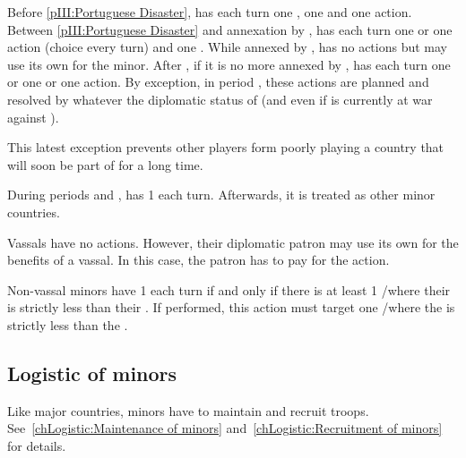 \aparag[Portugal]
\bparag Before \ref{pIII:Portuguese Disaster}, \paysPortugal has each turn one
\COL, one \TP and one \TFI action.
\bparag Between \ref{pIII:Portuguese Disaster} and annexation by \HIS,
\paysPortugal has each turn one \COL or one \TP action (choice every turn) and
one \TFI.
\bparag While annexed by \HIS, \paysPortugal has no actions but \HIS may use
its own for the minor.
\bparag After , if it is no more annexed by \HIS,
\paysPortugal has each turn one \COL or one \TP or one \TFI action.
\bparag By exception, in period , these actions are planned and
resolved by \HIS whatever the diplomatic status of \paysPortugal (and even if
\HIS is currently at war against \paysPortugal).

\begin{designnote}
  This latest exception prevents other players form poorly playing a country
  that will soon be part of \HIS for a long time.
\end{designnote}


\aparag[Venice]
\bparag During periods  and , \paysVenise has 1 \TFI each
turn.
\bparag Afterwards, it is treated as other minor countries.

\aparag[Vassals]
\bparag Vassals have no actions. However, their diplomatic patron may use its
own \TFI for the benefits of a vassal.
\bparag In this case, the patron has to pay for the action.

\bparag Non-vassal minors have 1 \TFI each turn if and only if there is at
least 1 \CTZ/\STZ where their  is strictly less than
their .
\bparag If performed, this action must target one \CTZ/\STZ where the
 is strictly less than the .

\subsection{Logistic of minors}
\aparag Like major countries, minors have to maintain and recruit
troops. See~\ref{chLogistic:Maintenance of minors}
and~\ref{chLogistic:Recruitment of minors} for details.


